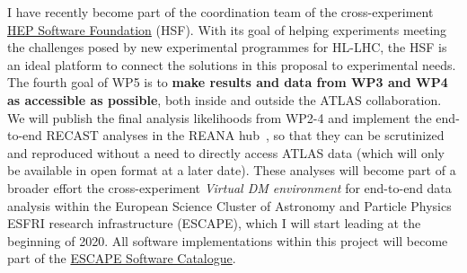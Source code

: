 I have recently become part of the coordination team of the cross-experiment \href{https://hepsoftwarefoundation.org}{HEP Software Foundation} (HSF). 
With its goal of helping experiments meeting the challenges posed by new experimental programmes for HL-LHC, the HSF is an ideal platform to connect the solutions in this proposal to experimental needs. 
\\
\indent
The fourth goal of WP5 is to \textbf{make results and data from WP3 and WP4 as accessible as possible}, both inside and outside the ATLAS collaboration. 
We will publish the final analysis likelihoods from WP2-4 and implement the end-to-end RECAST analyses in the REANA hub~\cite{ToBeCited}, %
so that they can be scrutinized and reproduced without a need to directly access ATLAS data (which will only be available in open format at a later date).
These analyses will become part of a broader effort the cross-experiment \textit{Virtual DM environment} for end-to-end data analysis within the European Science Cluster of Astronomy and Particle Physics ESFRI research infrastructure (ESCAPE), which I will start leading at the beginning of 2020. 
All software implementations within this project will become part of the \href{https://projectescape.eu/services/escape-software-data-catalogue}{ESCAPE Software Catalogue}. 




